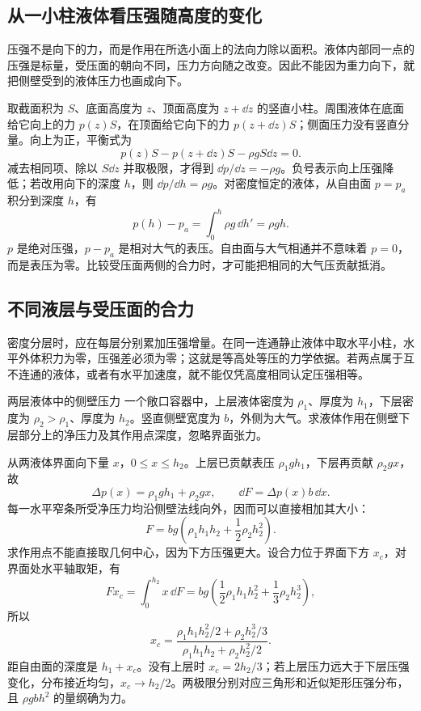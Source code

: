 \subsection{从一小柱液体看压强随高度的变化}
压强不是向下的力，而是作用在所选小面上的法向力除以面积。液体内部同一点的压强是标量，受压面的朝向不同，压力方向随之改变。因此不能因为重力向下，就把侧壁受到的液体压力也画成向下。

取截面积为 $S$、底面高度为 $z$、顶面高度为 $z+\dd z$ 的竖直小柱。周围液体在底面给它向上的力 $p(z)S$，在顶面给它向下的力 $p(z+\dd z)S$；侧面压力没有竖直分量。向上为正，平衡式为
\[
 p(z)S-p(z+\dd z)S-\rho gS\dd z=0.
\]
减去相同项、除以 $S\dd z$ 并取极限，才得到 $\dd p/\dd z=-\rho g$。负号表示向上压强降低；若改用向下的深度 $h$，则 $\dd p/\dd h=\rho g$。对密度恒定的液体，从自由面 $p=p_a$ 积分到深度 $h$，有
\[
 p(h)-p_a=\int_0^h\rho g\,\dd h'=\rho gh.
\]
$p$ 是绝对压强，$p-p_a$ 是相对大气的表压。自由面与大气相通并不意味着 $p=0$，而是表压为零。比较受压面两侧的合力时，才可能把相同的大气压贡献抵消。

\subsection{不同液层与受压面的合力}
密度分层时，应在每层分别累加压强增量。在同一连通静止液体中取水平小柱，水平外体积力为零，压强差必须为零；这就是等高处等压的力学依据。若两点属于互不连通的液体，或者有水平加速度，就不能仅凭高度相同认定压强相等。

\begin{origexamplebox}{两层液体中的侧壁压力}\label{ch13:ex:teaching-layered}
一个敞口容器中，上层液体密度为 $\rho_1$、厚度为 $h_1$，下层密度为 $\rho_2>\rho_1$、厚度为 $h_2$。竖直侧壁宽度为 $b$，外侧为大气。求液体作用在侧壁下层部分上的净压力及其作用点深度，忽略界面张力。

\ThQLayers
\end{origexamplebox}
\begin{xesolution}
\ThALayers

从两液体界面向下量 $x$，$0\le x\le h_2$。上层已贡献表压 $\rho_1gh_1$，下层再贡献 $\rho_2gx$，故
\[
 \Delta p(x)=\rho_1gh_1+\rho_2gx,
 \qquad \dd F=\Delta p(x)b\,\dd x.
\]
每一水平窄条所受净压力均沿侧壁法线向外，因而可以直接相加其大小：
\[
 F=bg\left(\rho_1h_1h_2+\frac12\rho_2h_2^2\right).
\]
求作用点不能直接取几何中心，因为下方压强更大。设合力位于界面下方 $x_c$，对界面处水平轴取矩，有
\[
 Fx_c=\int_0^{h_2}x\,\dd F
 =bg\left(\frac12\rho_1h_1h_2^2+\frac13\rho_2h_2^3\right),
\]
所以
\[
 x_c=\frac{\rho_1h_1h_2^2/2+\rho_2h_2^3/3}
 {\rho_1h_1h_2+\rho_2h_2^2/2}.
\]
距自由面的深度是 $h_1+x_c$。没有上层时 $x_c=2h_2/3$；若上层压力远大于下层压强变化，分布接近均匀，$x_c\to h_2/2$。两极限分别对应三角形和近似矩形压强分布，且 $\rho gbh^2$ 的量纲确为力。
\end{xesolution}

